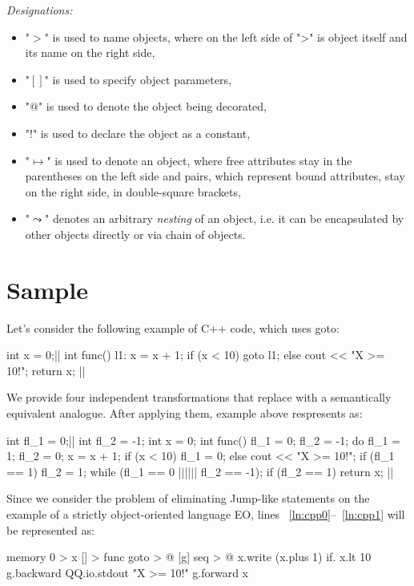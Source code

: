 \documentclass[sigplan,review,11pt,nonacm,natbib=false]{acmart}
\theoremstyle{theorems}
\begin{document}
\emph{Designations:}
\begin{itemize}
\item "$>$" is used to name objects, where on the left side of ">" is object itself and its name on the right side,
\item "$[]$" is used to specify object parameters,
\item "$@$" is used to denote the object being decorated,
\item "$!$" is used to declare the object as a constant,
\item "$\mapsto$" is used to denote an object, where free attributes stay in the parentheses on the left side and pairs, which represent bound attributes, stay on the right side, in double-square brackets,
\item "$\leadsto$" denotes an arbitrary \emph{nesting} of an object, i.e. it can be encapsulated by other objects directly or via chain of objects.
\end{itemize}


\section{Sample}
Let's consider the following example of C++ code, which uses goto:
\begin{ffcode}
int x = 0;|$\label{ln:cpp0}$|
int func() {
l1:
  x = x + 1;
  if (x < 10)
    goto l1;
  else
    cout << "X >= 10!\n";
  return x;
}|$\label{ln:cpp1}$|
\end{ffcode}

We provide four independent transformations that replace  with a semantically equivalent analogue.
After applying them, example above respresents as:
\begin{ffcode}
int fl_1 = 0;|$\label{ln:tcpp0}$|
int fl_2 = -1;
int x = 0;
int func() {
  fl_1 = 0;
  fl_2 = -1;
  do {
    fl_1 = 1;
    fl_2 = 0;
    x = x + 1;
    if (x < 10)
      fl_1 = 0;
    else
      cout << "X >= 10!\n";
    if (fl_1 == 1)
      fl_2 = 1;
  } while (fl_1 == 0 |$\vert$||$\vert$| fl_2 == -1);
  if (fl_2 == 1)
    return x;
}|$\label{ln:tcpp1}$|
\end{ffcode}

Since we consider the problem of eliminating Jump-like statements on the example of a strictly object-oriented language EO, lines ~\ref{ln:cpp0}--~\ref{ln:cpp1} will be represented as:
\begin{ffcode}
memory 0 > x
[] > func
  goto > @
    [g]
      seq > @
        x.write (x.plus 1)
        if.
          x.lt 10
          g.backward
          QQ.io.stdout "X >= 10!\n"
        g.forward x
\end{ffcode}
\end{document}
